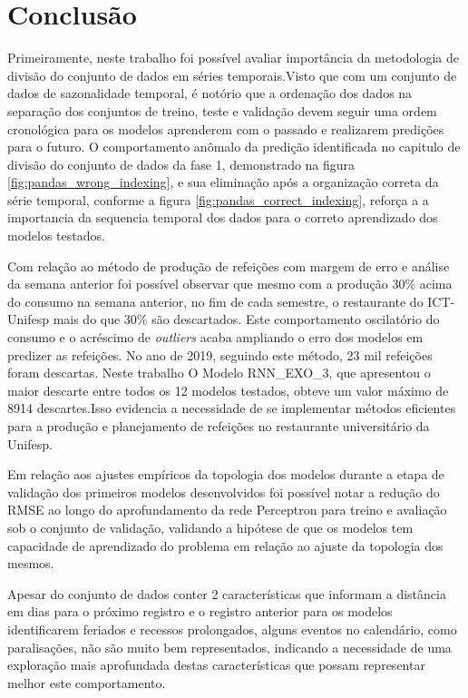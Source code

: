 \chapter{Conclusão} \label{cap:conclusoes}

    Primeiramente, neste trabalho foi possível avaliar importância da metodologia de divisão do conjunto de dados em séries temporais.Visto que com um conjunto de dados de sazonalidade temporal, é notório que a ordenação dos dados na separação dos conjuntos de treino, teste e validação devem seguir uma ordem cronológica para os modelos aprenderem com o passado e realizarem predições para o futuro. O comportamento anômalo da predição identificada no capitulo de divisão do conjunto de dados da fase 1, demonstrado na figura \ref{fig:pandas_wrong_indexing}, e sua eliminação após a organização correta da série temporal, conforme a figura \ref{fig:pandas_correct_indexing}, reforça a a importancia da sequencia temporal dos dados para o correto aprendizado dos modelos testados.
    
    Com relação ao método de produção de refeições com margem de erro e análise da semana anterior foi possível observar que mesmo com a produção 30\% acima do consumo na semana anterior, no fim de cada semestre, o restaurante do ICT-Unifesp  mais do que 30\% são descartados. Este comportamento oscilatório do consumo e o acréscimo de \textit{outliers} acaba ampliando o erro dos modelos em predizer as refeições. No ano de 2019, seguindo este método, 23 mil refeições foram descartas. Neste trabalho O Modelo RNN\_EXO\_3, que apresentou o maior descarte entre todos os 12 modelos testados, obteve um valor máximo de 8914 descartes.Isso evidencia a necessidade de se implementar métodos eficientes para a produção e planejamento de refeições no restaurante universitário da Unifesp.
    
    Em relação aos ajustes empíricos da topologia dos modelos durante a etapa de validação dos primeiros modelos desenvolvidos foi possível notar a redução do RMSE ao longo do aprofundamento da rede Perceptron para treino e avaliação sob o conjunto de validação, validando a hipótese de que os modelos tem capacidade de aprendizado do problema em relação ao ajuste da topologia dos mesmos.

    Apesar do conjunto de dados conter 2 características que informam a distância em dias para o próximo registro e o registro anterior para os modelos identificarem feriados e recessos prolongados, alguns eventos no calendário, como paralisações, não são muito bem representados, indicando a necessidade de uma exploração mais aprofundada destas características que possam representar melhor este comportamento.

